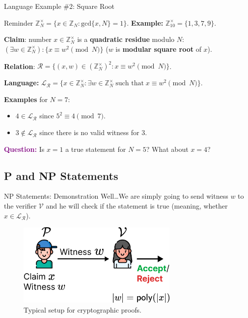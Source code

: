 \documentclass[xcolor={usenames,dvipsnames}]{beamer}
\begin{document}
    \begin{frame}{Language Example \#2: Square Root}
        \begin{block}{Reminder}
            $\mathbb{Z}_N^{\times} = \{x \in \mathbb{Z}_N: \text{gcd}\{x,N\}=1\}$. \textbf{Example:} $\mathbb{Z}_{10}^{\times} = \{1,3,7,9\}$.\pause
        \end{block}

        \begin{example}
            \textbf{Claim}: number $x \in \mathbb{Z}_N^{\times}$ is a \textbf{quadratic residue} modulo $N$: $(\exists w \in \mathbb{Z}_N^{\times}): \{x \equiv w^2 \pmod{N}\}$ ($w$ is \textbf{modular square root} of $x$). \pause
            
            \textbf{Relation}: $\mathcal{R} = \{ (x, w) \in (\mathbb{Z}_N^{\times})^2: x \equiv w^2 \pmod{N} \}$. \pause
        
            \textbf{Language:} $\mathcal{L}_{\mathcal{R}} = \{x \in \mathbb{Z}_N^{\times}: \exists w \in \mathbb{Z}_N^{\times} \; \text{such that} \; x \equiv w^2 \pmod{N}\}$. \pause
            
            \textbf{Examples} for $N=7$: 
            \begin{itemize}
                \item $4 \in \mathcal{L}_{\mathcal{R}}$ since $5^2 \equiv 4 \pmod{7}$. \pause
                \item $3 \not\in \mathcal{L}_{\mathcal{R}}$ since there is no valid witness for $3$. \pause
            \end{itemize}
        \end{example}

        \textcolor{purple}{\textbf{Question:}} Is $x=1$ a true statement for $N=5$? What about $x=4$?
    \end{frame}

    \subsection{P and NP Statements}

    \begin{frame}{NP Statements: Demonstration}
        Well\ldots We are simply going to send witness $w$ to the verifier $\mathcal{V}$ and he will check if the statement is true (meaning, whether $x \in \mathcal{L}_{\mathcal{R}}$).

        \begin{figure}
            \centering
            \includegraphics[width=0.7\textwidth]{images/lecture_6/np.pdf}
            \caption{Typical setup for cryptographic proofs.}
        \end{figure}
    \end{frame}
\end{document}
